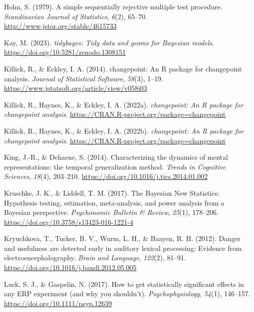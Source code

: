 \documentclass[
  doc,
  floatsintext,
  longtable,
  a4paper,
  nolmodern,
  notxfonts,
  notimes,
  colorlinks=true,linkcolor=blue,citecolor=blue,urlcolor=blue]{apa7}
\newlength{\cslhangindent}
\newenvironment{CSLReferences}[2] %
 {\begin{list}{}{%
  \setlength{\itemindent}{0pt}
  \setlength{\leftmargin}{0pt}
  \setlength{\parsep}{0pt}
  \ifodd #1
   \setlength{\leftmargin}{\cslhangindent}
   \setlength{\itemindent}{-1\cslhangindent}
  \fi
  \setlength{\itemsep}{#2\baselineskip}}}
 {\end{list}}
\begin{document}
\begin{CSLReferences}{1}{0}
Holm, S. (1979). A simple sequentially rejective multiple test
procedure. \emph{Scandinavian Journal of Statistics}, \emph{6}(2),
65--70. \url{http://www.jstor.org/stable/4615733}

Kay, M. (2023). \emph{{tidybayes}: Tidy data and geoms for {Bayesian}
models}. \url{https://doi.org/10.5281/zenodo.1308151}

Killick, R., \& Eckley, I. A. (2014). {changepoint}: An {R} package for
changepoint analysis. \emph{Journal of Statistical Software},
\emph{58}(3), 1--19.
\url{https://www.jstatsoft.org/article/view/v058i03}

Killick, R., Haynes, K., \& Eckley, I. A. (2022a). \emph{{changepoint}:
An {R} package for changepoint analysis}.
\url{https://CRAN.R-project.org/package=changepoint}

Killick, R., Haynes, K., \& Eckley, I. A. (2022b). \emph{{changepoint}:
An {R} package for changepoint analysis}.
\url{https://CRAN.R-project.org/package=changepoint}

King, J.-R., \& Dehaene, S. (2014). Characterizing the dynamics of
mental representations: the temporal generalization method. \emph{Trends
in Cognitive Sciences}, \emph{18}(4), 203--210.
\url{https://doi.org/10.1016/j.tics.2014.01.002}

Kruschke, J. K., \& Liddell, T. M. (2017). The Bayesian New Statistics:
Hypothesis testing, estimation, meta-analysis, and power analysis from a
Bayesian perspective. \emph{Psychonomic Bulletin \& Review},
\emph{25}(1), 178--206. \url{https://doi.org/10.3758/s13423-016-1221-4}

Kryuchkova, T., Tucker, B. V., Wurm, L. H., \& Baayen, R. H. (2012).
Danger and usefulness are detected early in auditory lexical processing:
Evidence from electroencephalography. \emph{Brain and Language},
\emph{122}(2), 81--91. \url{https://doi.org/10.1016/j.bandl.2012.05.005}

Luck, S. J., \& Gaspelin, N. (2017). How to get statistically
significant effects in any {ERP} experiment (and why you shouldn't).
\emph{Psychophysiology}, \emph{54}(1), 146--157.
\url{https://doi.org/10.1111/psyp.12639}


\end{CSLReferences}
\end{document}
